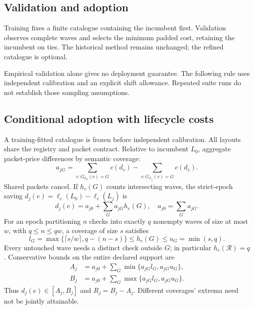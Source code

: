 \documentclass[10pt,journal,compsoc]{IEEEtran}
\theoremstyle{definition}\newtheorem{definition}[theorem]{Definition}
\begin{document}
\subsection{Validation and adoption}
Training fixes a finite catalogue containing the incumbent first.
Validation observes complete waves and selects the minimum padded cost,
retaining the incumbent on ties. The historical method remains unchanged;
the refined catalogue is optional.

Empirical validation alone gives no deployment guarantee. The following
rule uses independent calibration and an explicit shift allowance.
Repeated suite runs do not establish those sampling assumptions.

\subsection{Conditional adoption with lifecycle costs}\label{sec:adoption}
A training-fitted catalogue is frozen before independent calibration.
All layouts share the registry and packet contract. Relative to incumbent
$L_0$, aggregate packet-price differences by semantic coverage:
\[
a_{jG}=\sum_{v:G_{L_0}(v)=G}c(d_v)
       -\sum_{v:G_{L_j}(v)=G}c(d_v).
\]
Shared packets cancel. If $h_e(G)$ counts intersecting waves, the
strict-epoch saving $d_j(e)=\ell_e(L_0)-\ell_e(L_j)$ is
\begin{equation}\label{eq:paired-saving}
d_j(e)=a_{j0}+\sum_Ga_{jG}h_e(G),\quad a_{j0}=\sum_Ga_{jG}.
\end{equation}
For an epoch partitioning $n$ checks into exactly $q$ nonempty waves
of size at most $w$, with $q\le n\le qw$, a coverage of size $s$ satisfies
\begin{equation}\label{eq:hit-envelope}
l_G=\max\{\lceil s/w\rceil,q-(n-s)\}
 \le h_e(G)\le u_G=\min(s,q).
\end{equation}
Every untouched wave needs a distinct check outside $G$; in particular
$h_e(\mathcal R)=q$. Conservative bounds on the entire declared support are
\begin{align*}
A_j&=a_{j0}+\sum_G\min\{a_{jG}l_G,a_{jG}u_G\},\\
B_j&=a_{j0}+\sum_G\max\{a_{jG}l_G,a_{jG}u_G\}.
\end{align*}
Thus $d_j(e)\in[A_j,B_j]$ and $R_j=B_j-A_j$.
Different coverages' extrema need not be jointly attainable.
\end{document}
